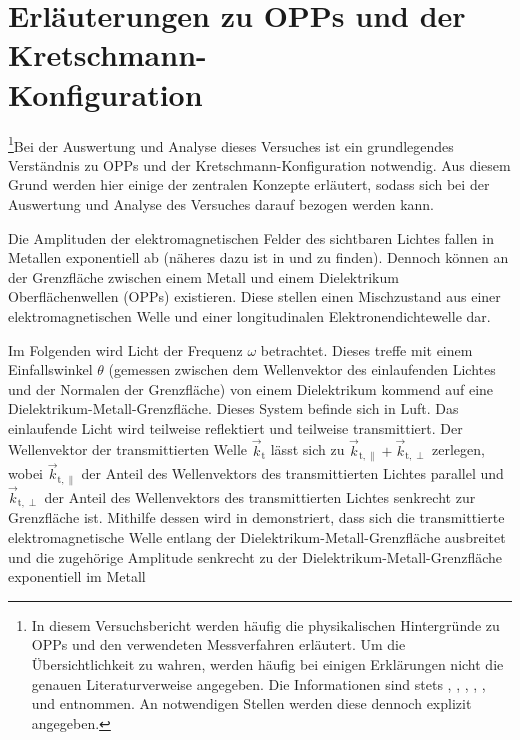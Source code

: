 \section{Erläuterungen zu OPPs und der Kretschmann-\\Konfiguration}\label{sec:erläuterung}
\footnote[1]{In diesem Versuchsbericht werden häufig die physikalischen Hintergründe zu OPPs und den verwendeten Messverfahren erläutert.
Um die Übersichtlichkeit zu wahren, werden häufig bei einigen Erklärungen nicht die genauen Literaturverweise angegeben. Die Informationen sind stets
\cite{linden_optik}, \cite{linden_photonics}, \cite{nano}, \cite{prism}, \cite{wiki:sp}, \cite{wiki:spp} und \cite{wiki:spr} entnommen. An notwendigen Stellen
werden diese dennoch explizit angegeben.}Bei der Auswertung und Analyse dieses Versuches ist ein grundlegendes Verständnis zu OPPs und der Kretschmann-Konfiguration notwendig.
Aus diesem Grund werden hier einige der zentralen Konzepte erläutert, sodass sich bei der Auswertung und Analyse des Versuches
darauf bezogen werden kann.\par
Die Amplituden der elektromagnetischen Felder des sichtbaren Lichtes fallen in Metallen exponentiell ab (näheres dazu ist in \cite{linden_optik} und \cite{linden_photonics}
zu finden). Dennoch können an der Grenzfläche zwischen einem Metall und einem Dielektrikum Oberflächenwellen (OPPs) existieren. Diese stellen
einen Mischzustand aus einer elektromagnetischen Welle und einer longitudinalen Elektronendichtewelle dar.\par
Im Folgenden wird Licht der Frequenz $\omega$ betrachtet. Dieses treffe mit einem Einfallswinkel $\theta$ (gemessen zwischen dem Wellenvektor des einlaufenden Lichtes
und der Normalen der Grenzfläche) von einem Dielektrikum kommend auf eine Dielektrikum-Metall-Grenzfläche. Dieses System befinde sich in Luft. Das einlaufende Licht wird teilweise reflektiert und teilweise transmittiert.
Der Wellenvektor der transmittierten Welle $\vec{k}_{\mathrm{t}}$ lässt sich zu $\vec{k}_{\mathrm{t},\parallel} + \vec{k}_{\mathrm{t},\perp}$ zerlegen, wobei
$\vec{k}_{\mathrm{t},\parallel}$ der Anteil des Wellenvektors des transmittierten Lichtes parallel und $\vec{k}_{\mathrm{t},\perp}$ der Anteil des
Wellenvektors des transmittierten Lichtes senkrecht zur Grenzfläche ist. Mithilfe dessen wird in \cite{linden_optik} demonstriert, dass sich die transmittierte elektromagnetische
Welle entlang der Dielektrikum-Metall-Grenzfläche ausbreitet und die zugehörige Amplitude senkrecht zu der Dielektrikum-Metall-Grenzfläche exponentiell im Metall
